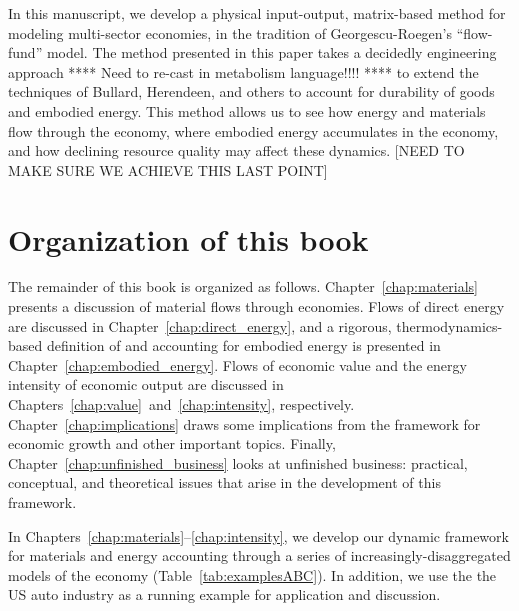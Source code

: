 In this manuscript, we develop a physical input-output, 
matrix-based method for modeling multi-sector economies, 
in the tradition of Georgescu-Roegen's ``flow-fund'' 
model.\cite{G-R1979a, G-R1979b} 
The method presented in this paper takes a decidedly engineering approach
**** Need to re-cast in metabolism language!!!! **** 
to extend the techniques of Bullard, Herendeen, and others 
to account for durability of goods and embodied energy. 
This method allows us to see how energy and materials flow through the economy, 
where embodied energy accumulates in the economy, 
and how declining resource quality may affect these dynamics. 
[NEED TO MAKE SURE WE ACHIEVE THIS LAST POINT]

\section{Organization of this book}
\label{sec:structure}

The remainder of this book is organized as follows. 
Chapter~\ref{chap:materials} presents a discussion of material flows through economies.
Flows of direct energy are discussed in Chapter~\ref{chap:direct_energy}, 
and a rigorous, thermodynamics-based definition of and accounting for 
embodied energy is presented in Chapter~\ref{chap:embodied_energy}. 
Flows of economic value and the energy intensity of economic output are
discussed in Chapters~\ref{chap:value}~and~\ref{chap:intensity}, respectively.
Chapter~\ref{chap:implications} draws some implications 
from the framework for economic growth and other important topics.
Finally, Chapter~\ref{chap:unfinished_business} looks at 
unfinished business: practical, conceptual, and theoretical issues
that arise in the development of this framework.

In Chapters~\ref{chap:materials}--\ref{chap:intensity},
we develop our dynamic framework for materials and energy accounting
through a series of increasingly-disaggregated
models of the economy (Table~\ref{tab:examplesABC}). 
In addition, we use the the US auto industry 
as a running example for application and discussion.

